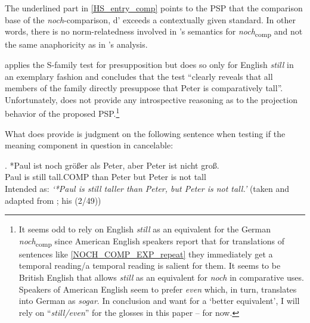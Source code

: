 \documentclass[output=paper,
modfonts
]{langscibook}
\begin{document}
The underlined part in \ref{HS_entry_comp} points to the PSP that the comparison base of the \textit{noch}-comparison, d' exceeds a contextually given standard. In other words, there is no norm-relatedness involved in \citeauthor{Hofstetter2013}'s semantics for \textit{noch}\textsubscript{comp} and not the same anaphoricity as in \citeauthor{umbach2009a_comp}'s \citeyearpar{umbach2009a_comp} analysis.

\citeauthor{Hofstetter2013} applies the S-family test \citep{kadmon2001} for presupposition but does so only for English \textit{still} in an exemplary fashion and concludes that the test ``clearly reveals that all members of the family directly presuppose that Peter is comparatively tall''. Unfortunately, \citeauthor{Hofstetter2013} does not provide any introspective reasoning as to the projection behavior of the proposed PSP.\footnote{ It seems odd to rely on English \textit{still} as an equivalent for the German \textit{noch}\textsubscript{comp} since American English speakers report that for translations of sentences like \ref{NOCH_COMP_EXP_repeat} they immediately get a temporal reading/a temporal reading is salient for them. It seems to be British English that allows \textit{still} as an equivalent for \textit{noch} in comparative uses. Speakers of American English seem to prefer \textit{even} which, in turn, translates into German as \textit{sogar}. In conclusion and want for a `better equivalent', I will rely on ``\textit{still\slash even}'' for the glosses in this paper -- for now.}

What \citeauthor{Hofstetter2013} does provide is judgment on the following sentence when testing if the meaning component in question in cancelable:

\exg. *Paul ist noch größer als Peter, aber Peter ist nicht groß.\\
Paul is still tall.COMP than Peter but Peter is not tall\\
Intended as: \textit{`*Paul is still taller than Peter, but Peter is not tall.'} \flushright\vspace{-9pt} (taken and adapted from \citealt[p.27]{Hofstetter2013}; his (2/49)) \label{hofstetter_ABER_peter_nicht_gross}

\end{document}
